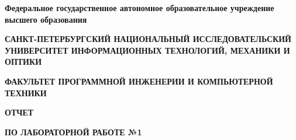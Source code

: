 \documentclass[12pt]{article}
\begin{document}
	\pagestyle{empty}
	\begin{center}
		\normalsize
		\textbf{Федеральное государственное автономное образовательное учреждение высшего образования}

		\small
		\medskip 
		\textbf{САНКТ-ПЕТЕРБУРГСКИЙ НАЦИОНАЛЬНЫЙ ИССЛЕДОВАТЕЛЬСКИЙ  УНИВЕРСИТЕТ ИНФОРМАЦИОННЫХ ТЕХНОЛОГИЙ, МЕХАНИКИ И ОПТИКИ}

		\medskip 
		\textbf{ФАКУЛЬТЕТ ПРОГРАММНОЙ ИНЖЕНЕРИИ И КОМПЬЮТЕРНОЙ ТЕХНИКИ}	
	\bigskip\bigskip\bigskip\bigskip\bigskip\bigskip\bigskip\bigskip\bigskip\bigskip\bigskip\bigskip	
		\par\medskip\par\smallskip\par\smallskip
		\Large 
		\textbf{ОТЧЕТ} 

		\textbf{ПО ЛАБОРАТОРНОЙ РАБОТЕ №1}


\end{center}
\end{document}
